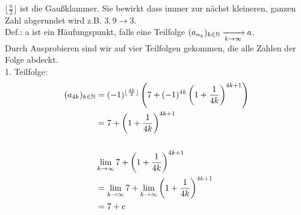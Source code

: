 \bigskip 

\begin{lsg}

$\lfloor \frac{n}{2}\rfloor$ ist die Gaußklammer. Sie bewirkt dass immer zur 
nächst kleineren, ganzen Zahl abgerundet wird z.B. $3,9 \rightarrow 3$.\\

Def.: a ist ein H\"aufungspunkt, falls eine Teilfolge $(a_{n_k})_{k\in\mathbb{N}} 
\xrightarrow[k \rightarrow \infty]{} a$.\\

Durch Ausprobieren sind wir auf vier Teilfolgen gekommen, die alle Zahlen der 
Folge abdeckt.\\

1. Teilfolge:\\
\[
\begin{aligned}
(a_{4k})_{k\in\mathbb{N}}
&=(-1)^{\lfloor \frac{4k}{2}\rfloor} \left( 7 + 
(-1)^{4k}\left(1+\frac{1}{4k}\right)^{4k+1} \right)\\
&=7+\left(1+\frac{1}{4k}\right)^{4k+1}\\
\\
&\lim \limits_{k \to \infty} 7+\left(1+\frac{1}{4k}\right)^{4k+1}\\
&=\lim \limits_{k \to \infty} 7 + \lim \limits_{k \to 
\infty}\left(1+\frac{1}{4k}\right)^{4k+1}\\
&=7+e
\end{aligned}
\]\\


\end{lsg}
